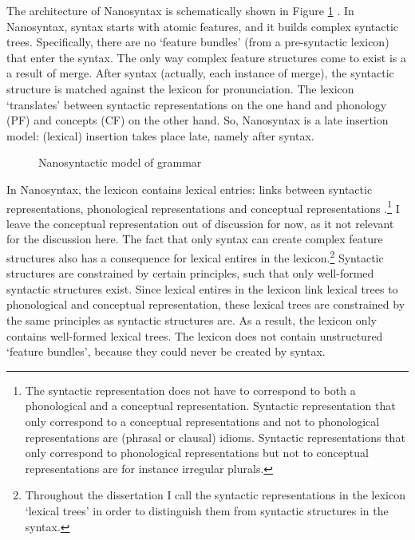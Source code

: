 The architecture of Nanosyntax is schematically shown in Figure \ref{fig:nano} \citep[from][]{vandenwyngaerd2020,caha2019}.
In Nanosyntax, syntax starts with atomic features, and it builds complex syntactic trees. Specifically, there are no `feature bundles' (from a pre-syntactic lexicon) that enter the syntax. The only way complex feature structures come to exist is a a result of merge.
After syntax (actually, each instance of merge), the syntactic structure is matched against the lexicon for pronunciation. The lexicon `translates' between syntactic representations on the one hand and phonology (PF) and concepts (CF) on the other hand. So, Nanosyntax is a late insertion model: (lexical) insertion takes place late, namely after syntax.

\begin{figure}[ht]
  \centering
  \caption{Nanosyntactic model of grammar}
  \label{fig:nano}
\end{figure}

In Nanosyntax, the lexicon contains lexical entries: links between syntactic representations, phonological representations and conceptual representations \citep{starke2014}.\footnote{
The syntactic representation does not have to correspond to both a phonological and a conceptual representation. Syntactic representation that only correspond to a conceptual representations and not to phonological representations are (phrasal or clausal) idioms. Syntactic representations that only correspond to phonological representations but not to conceptual representations are for instance irregular plurals.
} I leave the conceptual representation out of discussion for now, as it not relevant for the discussion here. The fact that only syntax can create complex feature structures also has a consequence for lexical entires in the lexicon.\footnote{
Throughout the dissertation I call the syntactic representations in the lexicon `lexical trees' in order to distinguish them from syntactic structures in the syntax.
}
Syntactic structures are constrained by certain principles, such that only well-formed syntactic structures exist. Since lexical entires in the lexicon link lexical trees to phonological and conceptual representation, these lexical trees are constrained by the same principles as syntactic structures are. As a result, the lexicon only contains well-formed lexical trees. The lexicon does not contain unstructured `feature bundles', because they could never be created by syntax.

